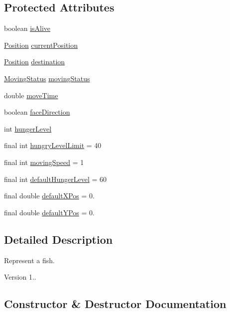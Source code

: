 \subsection*{Protected Attributes}
\begin{DoxyCompactItemize}
\item 
boolean \mbox{\hyperlink{class_fish_ad380340280b30f5700d206739b793d8f}{is\+Alive}}
\item 
\mbox{\hyperlink{class_position}{Position}} \mbox{\hyperlink{class_fish_a1f025627baa1802f78dab5fef88b7838}{current\+Position}}
\item 
\mbox{\hyperlink{class_position}{Position}} \mbox{\hyperlink{class_fish_a93523126df751dd0301a1fcf2ed42735}{destination}}
\item 
\mbox{\hyperlink{enum_moving_object_1_1_moving_status}{Moving\+Status}} \mbox{\hyperlink{class_fish_adb3e06c4c9cfd4e55a7d819c50702521}{moving\+Status}}
\item 
double \mbox{\hyperlink{class_fish_a630f9859f38f851ccdf223daebebd27f}{move\+Time}}
\item 
boolean \mbox{\hyperlink{class_fish_af86c6cd526847bf6be39c9cc170e5305}{face\+Direction}}
\item 
int \mbox{\hyperlink{class_fish_a9e0224f04ab5b9da07414075698bbbf1}{hunger\+Level}}
\item 
final int \mbox{\hyperlink{class_fish_a9d334546607726c92bc7e9a6ffd03f75}{hungry\+Level\+Limit}} = 40
\item 
final int \mbox{\hyperlink{class_fish_a9f5b20fab06597fda40be4c4d42473d0}{moving\+Speed}} = 1
\item 
final int \mbox{\hyperlink{class_fish_abb83de49d7a7fc239d603e11215e90f9}{default\+Hunger\+Level}} = 60
\item 
final double \mbox{\hyperlink{class_fish_a8b71b4abb80a350eca229e1f4c6656c4}{default\+X\+Pos}} = 0.
\item 
final double \mbox{\hyperlink{class_fish_a9ce14817daae461df29a23d247c87a80}{default\+Y\+Pos}} = 0.
\end{DoxyCompactItemize}


\subsection{Detailed Description}
Represent a fish. \begin{DoxyVersion}{Version}
1.. 
\end{DoxyVersion}


\subsection{Constructor \& Destructor Documentation}
\mbox{\label{class_fish_ae9ad0ceab4b720f2c37a4fd4693bdd2f}} 
